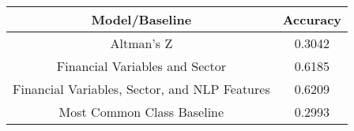 \footnotesize
\begin{tabular}{cc}
\toprule
Model/Baseline & Accuracy \\
\midrule
Altman's Z & 0.3042 \\
Financial Variables and Sector & 0.6185 \\
Financial Variables, Sector, and NLP Features & 0.6209 \\
Most Common Class Baseline & 0.2993 \\
\bottomrule
\end{tabular}

\normalsize